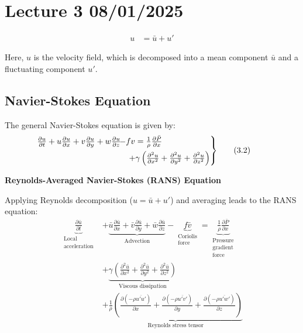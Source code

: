 \documentclass[fleqn,10pt]{SelfArx} %
\begin{document}
\section{Lecture 3 08/01/2025}
\begin{align*}
	u & = \bar{u} + u' \tag{3.1} \label{eq:u}
\end{align*}

Here, $u$ is the velocity field, which is decomposed into a mean component $\bar{u}$ and a fluctuating component $u'$.

\subsection{Navier-Stokes Equation}
The general Navier-Stokes equation is given by:
\begin{align*}
	\begin{rcases}
		\mspace{-20mu} \frac{\partial u}{\partial t} + u \frac{\partial u}{\partial x} + v \frac{\partial u}{\partial y} + w \frac{\partial u}{\partial z} & \!\!\!\!\!\!\!- f v = \frac{1}{\rho} \frac{\partial \bar{P}}{\partial x} \\ & + \gamma \left(\frac{\partial^2 u}{\partial x^2} + \frac{\partial^2 u}{\partial y^2}+ \frac{\partial^2 u}{\partial z^2}\right)
	\end{rcases} & \tag{3.2} \label{eq:Navier-stokes}
\end{align*}

\textbf{Reynolds-Averaged Navier-Stokes (RANS) Equation}

Applying Reynolds decomposition ($u = \bar{u} + u'$) and averaging leads to the RANS equation:
\begin{equation}
	\begin{aligned}
		\underbrace{\frac{\partial \bar{u}}{\partial t}}_{\substack{\text{Local} \\ \text{acceleration}}} &+ \underbrace{\bar{u} \frac{\partial \bar{u}}{\partial x} + \bar{v} \frac{\partial \bar{u}}{\partial y} + \bar{w} \frac{\partial \bar{u}}{\partial z}}_{\substack{\text{Advection}}} - \underbrace{f \bar{v}}_{\substack{\text{Coriolis} \\ \text{force}}} = \underbrace{\frac{1}{\rho} \frac{\partial \bar{P}}{\partial x}}_{\substack{\text{Pressure} \\ \text{gradient} \\ \text{force}}} \\  & + \underbrace{\gamma \left(\frac{\partial^2 \bar{u}}{\partial x^2} + \frac{\partial^2 \bar{u}}{\partial y^2} + \frac{\partial^2 \bar{u}}{\partial z^2}\right)}_{\text{Viscous dissipation}} \\ & + \underbrace{\frac{1}{\rho} \left(\frac{\partial \left(-\rho \overline{u'u'} \right)}{\partial x} + \frac{\partial \left(-\rho \overline{u'v'} \right)}{\partial y} + \frac{\partial \left(-\rho \overline{u'w'} \right)}{\partial z}\right)}_{\text{Reynolds stress tensor}}
	\end{aligned}
	\tag{3.3} \label{eq:rans}
\end{equation}
\end{document}
